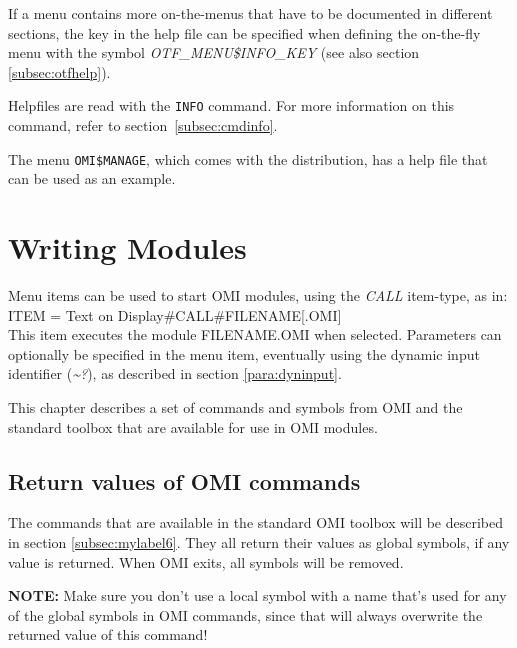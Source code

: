 \documentclass[a4paper]{book}
\newcommand{\vs}{\vspace{3mm}}
\begin{document}
If a menu contains more on-the-menus that have to be documented in different sections, the key in the help file can be specified when defining the on-the-fly menu with the symbol \textsl{OTF{\_}MENU{\$}INFO{\_}KEY} (see also section \ref{subsec:otfhelp}).

\vs

Helpfiles are read with the \texttt{INFO} command. For
more information on this command, refer to section~\ref{subsec:cmdinfo}.


\vs

The menu \texttt{OMI{\$}MANAGE}, which comes with the distribution,
has a help file that can be used as an example.

\chapter{Writing Modules}
\label{sec:writing}

Menu items can be used to start OMI modules, using the \textsl{CALL} item-type, as 
in: \\
\noindent\textsf{ITEM = Text on Display{\#}CALL{\#}FILENAME[.OMI]} \\
This item executes the module FILENAME.OMI when selected. Parameters can 
optionally be specified in the menu item, eventually using the dynamic input 
identifier (\textsl{\~{}?}), as described in section \ref{para:dyninput}.

\vs

This chapter describes a set of commands and symbols from OMI and the 
standard toolbox that are available for use in OMI modules.

\section{Return values of OMI commands}
\label{subsec:return}

The commands that are available in the standard OMI toolbox will be 
described in section \ref{subsec:mylabel6}. They all return their values as global symbols, if 
any value is returned. When OMI exits, all symbols will be removed.

\vs

\hspace{-8mm}\textbf{NOTE:} Make sure you don't use a local symbol with a name that's 
used for any of the global symbols in OMI commands, since that will always 
overwrite the returned value of this command!
\end{document}
